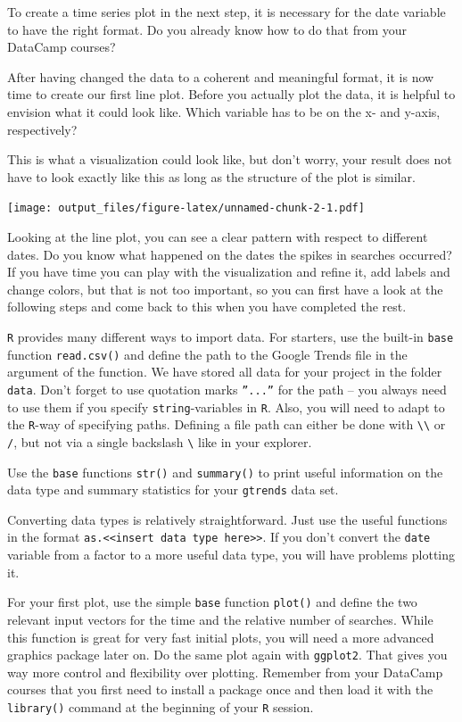\documentclass[
  11pt,
]{article}
\newenvironment{tips}[1]
  {
  \begin{itemize}
  \footnotesize
  \renewcommand{\labelitemi}{
    \raisebox{-.7\height}[0pt][0pt]{
      {\setkeys{Gin}{width=3em,keepaspectratio}
        \texttt{[image: images/\#1.png]}}
    }
  }
  \setlength{\fboxsep}{1em}
  \begin{rbox}
  \item
  }
  {
  \end{rbox}
  \end{itemize}
  }
\begin{document}
To create a time series plot in the next step, it is necessary for the date variable to have the right format. Do you already know how to do that from your DataCamp courses?

After having changed the data to a coherent and meaningful format, it is now time to create our first line plot. Before you actually plot the data, it is helpful to envision what it could look like. Which variable has to be on the x- and y-axis, respectively?

This is what a visualization could look like, but don't worry, your result does not have to look exactly like this as long as the structure of the plot is similar.

\texttt{[image: output\_files/figure-latex/unnamed-chunk-2-1.pdf]}

Looking at the line plot, you can see a clear pattern with respect to different dates. Do you know what happened on the dates the spikes in searches occurred? If you have time you can play with the visualization and refine it, add labels and change colors, but that is not too important, so you can first have a look at the following steps and come back to this when you have completed the rest.

\begin{tips}r

\texttt{R} provides many different ways to import data. For starters, use the built-in \texttt{base} function \texttt{read.csv()} and define the path to the Google Trends file in the argument of the function. We have stored all data for your project in the folder \texttt{data}. Don't forget to use quotation marks \texttt{”...”} for the path -- you always need to use them if you specify \texttt{string}-variables in \texttt{R}. Also, you will need to adapt to the \texttt{R}-way of specifying paths. Defining a file path can either be done with \texttt{\textbackslash{}\textbackslash{}} or \texttt{/}, but not via a single backslash \texttt{\textbackslash{}} like in your explorer.

Use the \texttt{base} functions \texttt{str()} and \texttt{summary()} to print useful information on the data type and summary statistics for your \texttt{gtrends} data set.

Converting data types is relatively straightforward. Just use the useful functions in the format \texttt{as.\textless{}\textless{}insert\ data\ type\ here\textgreater{}\textgreater{}}. If you don't convert the \texttt{date} variable from a factor to a more useful data type, you will have problems plotting it.

For your first plot, use the simple \texttt{base} function \texttt{plot()} and define the two relevant input vectors for the time and the relative number of searches. While this function is great for very fast initial plots, you will need a more advanced graphics package later on. Do the same plot again with \texttt{ggplot2}. That gives you way more control and flexibility over plotting. Remember from your DataCamp courses that you first need to install a package once and then load it with the \texttt{library()} command at the beginning of your \texttt{R} session.

\end{tips}
\end{document}
